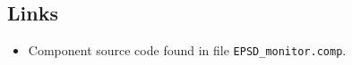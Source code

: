 \subsection*{Links}
\begin{itemize}
  \item Component source code found in file \texttt{EPSD\_monitor.comp}.
\end{itemize}
